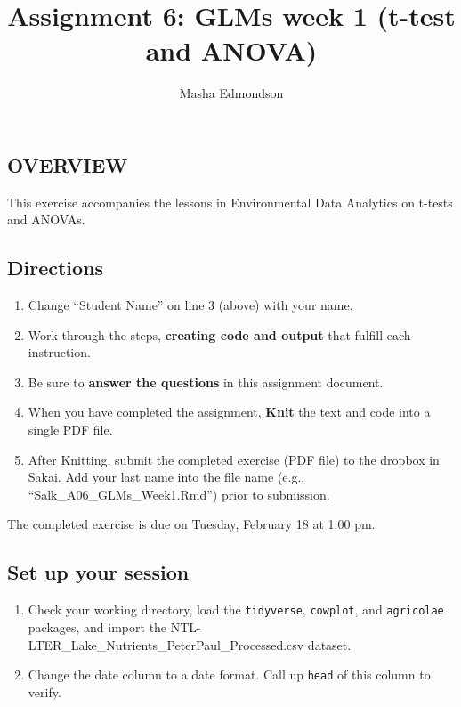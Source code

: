 \documentclass[]{article}
\title{Assignment 6: GLMs week 1 (t-test and ANOVA)}
\author{Masha Edmondson}
\date{}
\providecommand{\tightlist}{%
  \setlength{\itemsep}{0pt}\setlength{\parskip}{0pt}}
\begin{document}
\maketitle

\hypertarget{overview}{%
\subsection{OVERVIEW}\label{overview}}

This exercise accompanies the lessons in Environmental Data Analytics on
t-tests and ANOVAs.

\hypertarget{directions}{%
\subsection{Directions}\label{directions}}

\begin{enumerate}
\def\labelenumi{\arabic{enumi}.}
\tightlist
\item
  Change ``Student Name'' on line 3 (above) with your name.
\item
  Work through the steps, \textbf{creating code and output} that fulfill
  each instruction.
\item
  Be sure to \textbf{answer the questions} in this assignment document.
\item
  When you have completed the assignment, \textbf{Knit} the text and
  code into a single PDF file.
\item
  After Knitting, submit the completed exercise (PDF file) to the
  dropbox in Sakai. Add your last name into the file name (e.g.,
  ``Salk\_A06\_GLMs\_Week1.Rmd'') prior to submission.
\end{enumerate}

The completed exercise is due on Tuesday, February 18 at 1:00 pm.

\hypertarget{set-up-your-session}{%
\subsection{Set up your session}\label{set-up-your-session}}

\begin{enumerate}
\def\labelenumi{\arabic{enumi}.}
\item
  Check your working directory, load the \texttt{tidyverse},
  \texttt{cowplot}, and \texttt{agricolae} packages, and import the
  NTL-LTER\_Lake\_Nutrients\_PeterPaul\_Processed.csv dataset.
\item
  Change the date column to a date format. Call up \texttt{head} of this
  column to verify.
\end{enumerate}
\end{document}
